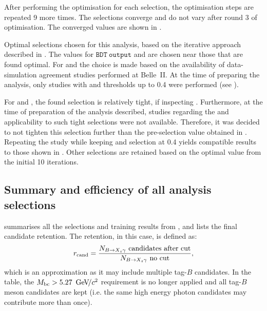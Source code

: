 After performing the optimisation for each selection, the optimisation steps are repeated 9 more times.
The selections converge and do not vary after round 3 of optimisation.
The converged values are shown in .

\begin{table}[hbtp!]
    \centering
    \caption{\label{tab:interative_optimisation} Optimal selections chosen for this analysis, based on the iterative approach described in .
    The values for $\mathtt{BDT~output}$ and \ZMVA are chosen near those that are found optimal.
    For \piVeto and \etaVeto the choice is made based on the availability of data-simulation agreement studies performed at Belle~II.
    At the time of preparing the analysis, 
    only studies with \piVeto and \etaVeto thresholds 
    up to 0.4 were performed (see ).
    }
    
\end{table}

For \piVeto and \etaVeto, the found selection is relatively tight, if inspecting .
Furthermore, at the time of preparation of the analysis described, studies regarding the \piVeto and \etaVeto applicability to such tight selections were not available.
Therefore, it was decided to not tighten this selection further than the pre-selection value obtained in .
Repeating the study while keeping \piVeto and \etaVeto selection at 0.4 yields compatible results to those shown in .
Other selections are retained based on the optimal value from the initial 10 iterations.

\subsection{Summary and efficiency of all analysis selections}\label{sec:selection_summary}

 summarises all the selections and \BDT training results from ,
and lists the final \BtoXsgamma candidate retention.
The retention, in this case, is defined as:
\begin{equation}\label{eq:loose_efficiency}
    r_{\mathrm{cand}} = \frac{N_{\BtoXsgamma}~\mathrm{candidates~after~cut}}{N_{\BtoXsgamma}~\mathrm{no~cut}},
\end{equation}
which is an approximation as it may include multiple tag-$B$ candidates.
In the table, the ${M_{\mathrm{bc}}}>5.27~{\mathrm{\,Ge\kern -0.1em V\!/}c^2}$ requirement is no longer applied and all tag-$B$ meson candidates are kept (i.e. the same high energy photon candidates may contribute more than once).

